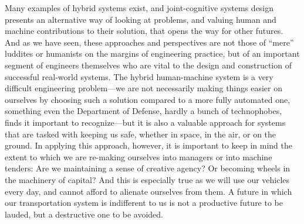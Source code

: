 Many examples of hybrid systems exist, and joint-cognitive systems
design presents an alternative way of looking at problems, and valuing
human and machine contributions to their solution, that opens the way
for other futures. And as we have seen, these approaches and
perspectives are not those of ``mere'' luddites or humanists on the
margins of engineering practice, but of an important segment of
engineers themselves who are vital to the design and construction of
successful real-world systems. The hybrid human-machine system is a
very difficult engineering problem---we are not necessarily making
things easier on ourselves by choosing such a solution compared to a
more fully automated one, something even the Department of Defense,
hardly a bunch of technophobes, finds it important to recognize---but
it is also a valuable approach for 
systems that are tasked with keeping us safe, whether in space, in the
air, or on the ground. In applying this approach, however, it is
important to keep in mind the extent to which we are re-making
ourselves into managers or into machine tenders:  Are we maintaining a sense of
creative agency? Or becoming wheels in the machinery of capital? And
this is especially true as we will use our 
vehicles every day, and cannot afford to alienate ourselves from them.
A future in which our transportation system is indifferent to us is
not a productive future to be lauded, but a destructive one to be
avoided. 

